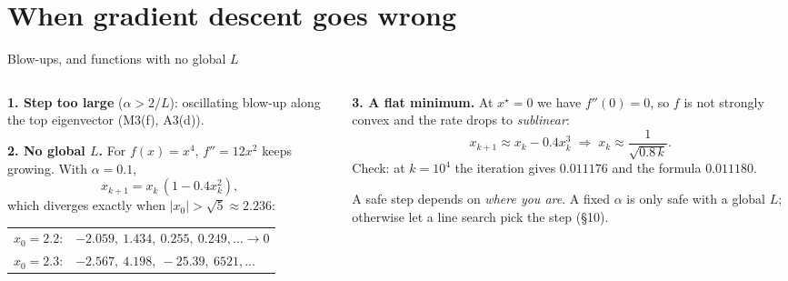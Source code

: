 \section{When gradient descent goes wrong}

\begin{frame}{Blow-ups, and functions with no global $L$}
  \begin{columns}[T]
    \begin{column}{0.5\textwidth}
      \textbf{1. Step too large} ($\alpha>2/L$): oscillating blow-up along the top eigenvector (M3(f), A3(d)).

      \vspace{4pt}
      \textbf{2. No global $L$.} For $f(x) = x^4$, $f'' = 12x^2$ keeps growing. With $\alpha = 0.1$,
      \[
        x_{k+1} = x_k\,(1 - 0.4x_k^2),
      \]
      which diverges exactly when $|x_0|>\sqrt5\approx2.236$:

      \vspace{2pt}
      \footnotesize
      \begin{tabular}{@{}l l@{}}
        $x_0 = 2.2$: & $-2.059,\ 1.434,\ 0.255,\ 0.249,\dots\to0$\\
        $x_0 = 2.3$: & $-2.567,\ 4.198,\ -25.39,\ 6521,\dots$
      \end{tabular}
    \end{column}
    \begin{column}{0.48\textwidth}
      \textbf{3. A flat minimum.} At $x^\star = 0$ we have $f''(0) = 0$, so $f$ is not strongly convex and the rate
      drops to \emph{sublinear}:
      \[
        x_{k+1}\approx x_k - 0.4x_k^3 \;\Rightarrow\; x_k\approx\frac{1}{\sqrt{0.8\,k}} .
      \]
      \footnotesize Check: at $k = 10^4$ the iteration gives $0.011176$ and the formula $0.011180$.

      \vspace{4pt}
      \begin{warnbox}[Lesson]
        \small A safe step depends on \emph{where you are}. A fixed $\alpha$ is only safe with a global $L$;
        otherwise let a line search pick the step (\S10).
      \end{warnbox}
    \end{column}
  \end{columns}
\end{frame}

